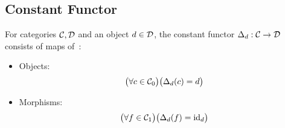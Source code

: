 \subsection{Constant Functor}
\begin{definition}
  For categories $\mathcal{C},\mathcal{D}$ and an object $d\in \mathcal{D}$, the constant functor
  $\Delta_d: \mathcal{C}\to \mathcal{D}$ consists of maps
  of~\parencite[p.~142]{leinster:basic_category_theory}:
  \begin{itemize}
    \item Objects:
      \[\big(\forall c\in \mathcal{C}_0\big)
        \big(\Delta_d(c) = d\big)\]
    \item Morphisms:
      \[\big(\forall f\in \mathcal{C}_1\big)
        \big(\Delta_d(f) = \mathrm{id}_d\big)\]
  \end{itemize}
\end{definition}
